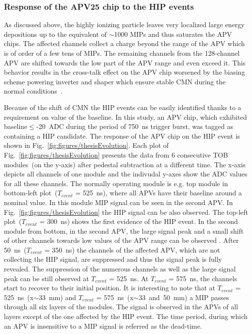 

\subsubsection{Response of the APV25 chip to the HIP events}

As discussed above, the highly ionizing particle leaves very localized large energy depositions up to the equivalent of $\sim$1000 MIPs and thus saturates the APV chips. The affected channels collect a charge beyond the range of the APV which is of order of a few tens of MIPs. The remaining channels from the 128-channel APV are shifted towards the low part of the APV range and even exceed it. This behavior results in the cross-talk effect on the APV chip worsened by the biasing scheme powering inverter and shaper which ensure stable CMN during the normal conditions~\cite{Bainbridge:2004jc}. 

Because of the shift of CMN the HIP events can be easily identified thanks to a requirement on value of the baseline. In this study, an APV chip, which exhibited baseline$\leq$-20~ADC during the period of 750~ns trigger burst, was tagged as containing a  HIP candidate. The response of the APV chip on the HIP event is shown in Fig.~\ref{fig:figures/thesisEvolution}. Each plot of Fig.~\ref{fig:figures/thesisEvolution} presents the data from 6 consecutive TOB modules~(on the y-axis) after pedestal subtraction at a different time. The x-axis depicts all channels of one module and the indivudal y-axes show the ADC values for all these channels. The normally operating module is e.g. top module in bottom-left plot~($T_{event}$ = 525~ns), where all APVs have their baseline around a nominal value. In this module MIP signal can be seen in the second APV. In Fig.~\ref{fig:figures/thesisEvolution} the HIP signal can be also observed. The top-left plot~($T_{event}$ = 300~ns) shows the first evidence of the HIP event. In the second module from bottom, in the second APV, the large signal peak and a small shift of other channels towards low values of the APV range can be observed . After 50~ns~($T_{event}$ = 350~ns) the channels of the affected APV, which are not collecting the HIP signal, are suppressed and thus the signal peak is fully revealed. The suppression of the numerous channels as well as the large signal peak can be still observed at $T_{event}$ = 525~ns. At $T_{event}$ = 575~ns, the channels start to recover to their initial position. It is interesting to note that at $T_{event}$ = 525~ns~(x$\sim$33~mm) and $T_{event}$ = 575~ns~(x$\sim$33~and~50~mm) a MIP passes through all six layers of the modules. The signal is observed in the APVs of all layers except of the one affected by the HIP event. The time period, during which an APV is insensitive to a MIP signal is referred as the dead-time.

